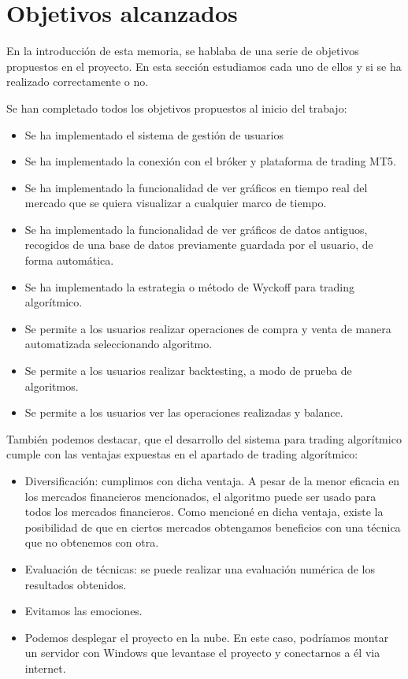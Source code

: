 \section{Objetivos alcanzados}

En la introducción de esta memoria, se hablaba de una serie de objetivos propuestos en el proyecto. En esta sección estudiamos cada uno de ellos y si se ha realizado correctamente o no.\newline

Se han completado todos los objetivos propuestos al inicio del trabajo:

\begin{itemize}
	\item Se ha implementado el sistema de gestión de usuarios
	\item Se ha implementado la conexión con el bróker y plataforma de trading MT5.
	\item Se ha implementado la funcionalidad de ver gráficos en tiempo real del mercado que se quiera visualizar a cualquier marco de tiempo.
	\item Se ha implementado la funcionalidad de ver gráficos de datos antiguos, recogidos de una base de datos previamente guardada por el usuario, de forma automática.
	\item Se ha implementado la estrategia o método de Wyckoff para trading algorítmico.
	\item Se permite a los usuarios realizar operaciones de compra y venta de manera automatizada seleccionando algoritmo.
	\item Se permite a los usuarios realizar backtesting, a modo de prueba de algoritmos.
	\item Se permite a los usuarios ver las operaciones realizadas y balance.
\end{itemize}

También podemos destacar, que el desarrollo del sistema para trading algorítmico cumple con las ventajas expuestas en el apartado de trading algorítmico:

\begin{itemize}
	\item Diversificación: cumplimos con dicha ventaja. A pesar de la menor eficacia en los mercados financieros mencionados, el algoritmo puede ser usado para todos los mercados financieros. Como mencioné en dicha ventaja, existe la posibilidad de que en ciertos mercados obtengamos beneficios con una técnica que no obtenemos con otra.
	\item Evaluación de técnicas: se puede realizar una evaluación numérica de los resultados obtenidos.
	\item Evitamos las emociones.
	\item Podemos desplegar el proyecto en la nube. En este caso, podríamos montar un servidor con Windows que levantase el proyecto y conectarnos a él via internet.
\end{itemize}

